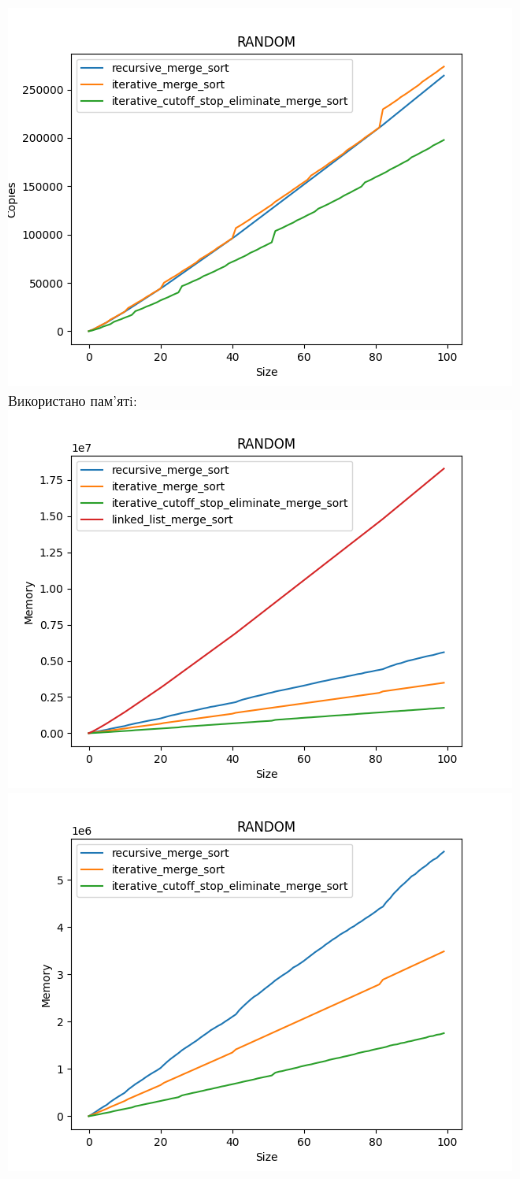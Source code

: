 \documentclass{article}
\begin{document}
            \includegraphics[scale=0.5]{random_Copies_3_sorts.png}
        \newline
        Використано пам’ятi:
        \newline
            \includegraphics[scale=0.5]{random_Memory_4_sorts.png}
            \includegraphics[scale=0.5]{random_Memory_3_sorts.png}
        \newline
\end{document}
